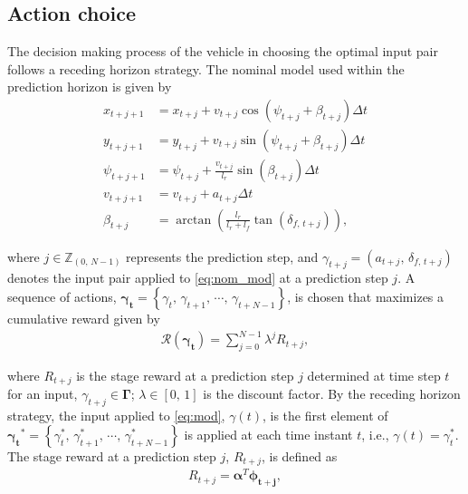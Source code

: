 \documentclass[10pt,journal]{IEEEtran}
\begin{document}
	\subsection{Action choice}
	\label{sec:action_choice}
	
	The decision making process of the vehicle in choosing the optimal input pair follows a receding horizon strategy. The nominal model used within the prediction horizon is given by
	\begin{subequations}
		\begin{align}
			x_{t+j+1} & = 	x_{t+j} + v_{t+j} \cos\left(\psi_{t+j} + \beta_{t+j} \right) \Delta t \\ 
			y_{t+j+1} & = 	y_{t+j} + v_{t+j} \sin\left(\psi_{t+j} + \beta_{t+j} \right) \Delta t  \\ 
			\psi_{t+j+1} & = 	\psi_{t+j} + \frac{v_{t+j}}{l_r} \sin\left( \beta _{t+j} \right) \Delta t \\ 
			v_{t+j+1} & = 	v_{t+j} + a_{t+j}  \Delta t\\
			\beta_{t+j} & = \arctan\left(\frac{l_r}{l_r+l_f}\tan\left(\delta_{f,\,{t+j}}\right)\right),
		\end{align}
	\label{eq:nom_mod}
	\end{subequations}

	\noindent where $j \in \mathbb{Z}_{\left(0,\,N-1\right)}$  represents the prediction step, and $\gamma_{t+j} = \left(a_{t+j},\, \delta_{f,\,t+j}\right)$ denotes the input pair applied to \eqref{eq:nom_mod} at a prediction step $j$. A sequence of actions, $\boldsymbol{\gamma_{t}} = \left\{\gamma_{t},\,\gamma_{t+1},\,\cdots,\,\gamma_{t+N-1}\right\}$, is chosen that maximizes a cumulative reward given by
	\begin{align}
	\mathcal{R}\left(\boldsymbol{\gamma_{t}}\right) = \sum_{j=0}^{N-1} \lambda^{j} R_{t+j},
	\label{eq:cum_reward}
	\end{align}
	
	\noindent where $R_{t+j}$ is the stage reward at a prediction step $j$ determined at time step $t$ for an input, $\gamma_{t+j} \in  \boldsymbol{\Gamma}$; $\lambda \in \left[0,\,1\right]$ is the discount factor. By the receding horizon strategy, the input applied to \eqref{eq:mod}, $\gamma\left(t\right)$, is the first element of $\boldsymbol{\gamma_{t}}^* = \left\{\gamma_{t}^*,\,\gamma_{t+1}^*,\,\cdots,\,\gamma_{t+N-1}^*\right\}$ is applied at each time instant $t$, i.e.,  $\gamma\left(t\right) = \gamma_{t}^*$. The stage reward at a prediction step $j$, $R_{t+j}$, is defined as
	 \begin{align}
	 R_{t+j} = \boldsymbol{{\alpha}}^T \boldsymbol{\phi_{t+j}},
	 \label{eq:stage_reward}
	 \end{align}
	
\end{document}

